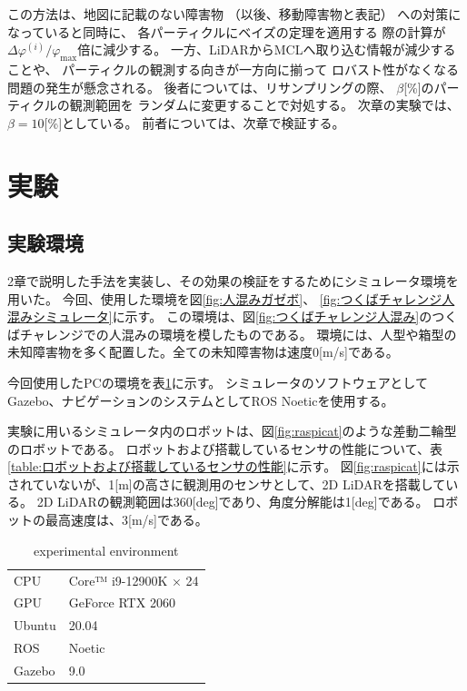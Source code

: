 \documentclass{jarticle}
\begin{document}
この方法は、地図に記載のない障害物
（以後、移動障害物と表記）
への対策になっていると同時に、
各パーティクルにベイズの定理を適用する
際の計算が$\Delta\varphi^{(i)}/\varphi_\text{max}$倍に減少する。
一方、LiDARからMCLへ取り込む情報が減少することや、
パーティクルの観測する向きが一方向に揃って
ロバスト性がなくなる問題の発生が懸念される。
後者については、リサンプリングの際、
$\beta$[\%]のパーティクルの観測範囲を
ランダムに変更することで対処する。
次章の実験では、$\beta=10$[\%]としている。
前者については、次章で検証する。

\section{実験}%

\subsection{実験環境}

2章で説明した手法を実装し、その効果の検証をするためにシミュレータ環境を用いた。
今回、使用した環境を図\ref{fig:人混みガゼボ}、
\ref{fig:つくばチャレンジ人混みシミュレータ}に示す。
この環境は、図\ref{fig:つくばチャレンジ人混み}のつくばチャレンジでの人混みの環境を模したものである。
環境には、人型や箱型の未知障害物を多く配置した。全ての未知障害物は速度0[m/s]である。

今回使用したPCの環境を表\ref{table:PCの環境}に示す。
シミュレータのソフトウェアとしてGazebo、ナビゲーションのシステムとしてROS Noeticを使用する。

実験に用いるシミュレータ内のロボットは、図\ref{fig:raspicat}のような差動二輪型のロボットである。
ロボットおよび搭載しているセンサの性能について、表\ref{table:ロボットおよび搭載しているセンサの性能}に示す。
図\ref{fig:raspicat}には示されていないが、1[m]の高さに観測用のセンサとして、2D LiDARを搭載している。
2D LiDARの観測範囲は360[deg]であり、角度分解能は1[deg]である。
ロボットの最高速度は、3[m/s]である。

\begin{table}[hbtp]
  \caption{experimental environment}
  \label{table:PCの環境}
  \centering
  \begin{tabular}{ll}
    \hline
    \small{CPU}     & \small{Core™ i9-12900K × 24} \\
    \small{GPU}     & \small{GeForce RTX 2060} \\
    \small{Ubuntu}  & \small{20.04} \\
    \small{ROS}     & \small{Noetic} \\
    \small{Gazebo}  & \small{9.0} \\
    \hline
  \end{tabular}
\end{table}
\end{document}
